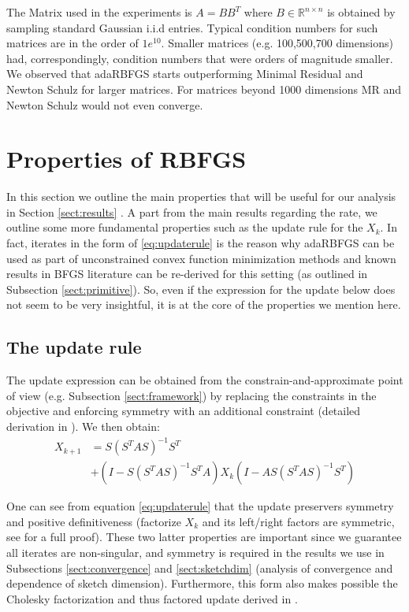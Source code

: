 \documentclass[12pt,conference,compsocconf]{IEEEtran}
\newcommand{\R}{\mathbb{R}}
\begin{document}
The Matrix used in the experiments is $A=BB^T$ where $B \in \R^{n\times n}$ is obtained by sampling standard Gaussian i.i.d entries. Typical condition numbers for such matrices are in the order of $1e^{10}$. Smaller matrices (e.g. 100,500,700 dimensions) had, correspondingly, condition numbers that were orders of magnitude smaller. We observed that adaRBFGS starts outperforming Minimal Residual and Newton Schulz for larger matrices. For matrices beyond 1000 dimensions MR and Newton Schulz would not even converge.

\section{Properties of RBFGS}\label{sect:propertiesRBFGS}
In this section we outline the main properties that will be useful for our analysis in Section \ref{sect:results} . A part from the main results regarding the rate, we outline some more fundamental properties such as the update rule for the $X_k$. In fact, iterates in the form of \eqref{eq:updaterule} is the reason why adaRBFGS can be used as part of unconstrained convex function minimization methods and known results in BFGS literature can be re-derived for this setting (as outlined in Subsection \ref{sect:primitive}). So, even if the expression for the update below does not seem to be very insightful, it is at the core of the properties we mention here.

\subsection{The update rule}
The update expression can be obtained from the constrain-and-approximate point of view (e.g. Subsection \ref{sect:framework}) by replacing the constraints in the objective and enforcing symmetry with an additional constraint (detailed derivation in \cite{Gower1}). We then obtain:
\begin{align}\label{eq:updaterule}
	X_{k+1}&= S(S^TAS)^{-1}S^T\\ \nonumber
	    &+ (I-S(S^TAS)^{-1}S^TA)X_k(I-AS(S^TAS)^{-1}S^T) \nonumber
\end{align}

One can see from equation \eqref{eq:updaterule} that the update preservers symmetry and positive definitiveness (factorize $X_k$ and its left/right factors are symmetric, see \cite{Gower1} for a full proof). These two latter properties are important since we guarantee all iterates are non-singular, and symmetry is required in the results we use in Subsections \ref{sect:convergence} and \ref{sect:sketchdim} (analysis of convergence and dependence of sketch dimension). Furthermore, this form also makes possible the Cholesky factorization and thus factored update derived in \cite{Gratton}.
\end{document}
